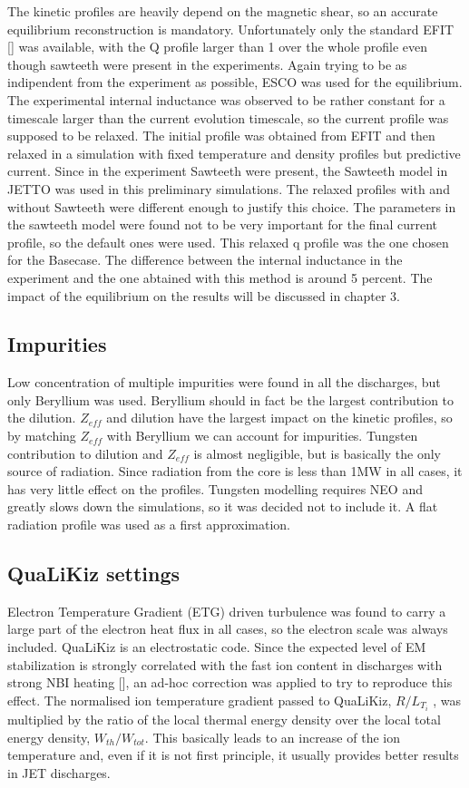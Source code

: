 \documentclass[a4paper,10pt]{iopart}
\begin{document}
The kinetic profiles are heavily depend on the magnetic shear, so an accurate equilibrium reconstruction is mandatory. Unfortunately only the standard EFIT [] was available, with the Q profile larger than 1 over the whole profile even though sawteeth were present in the experiments. Again trying to be as indipendent from the experiment as possible, ESCO was used for the equilibrium. The experimental internal inductance was observed to be rather constant for a timescale larger than the current evolution timescale, so the current profile was supposed to be relaxed. 
The initial profile was obtained from EFIT and then relaxed in a simulation with fixed temperature and density profiles but predictive current. Since in the experiment Sawteeth were present, the Sawteeth model in JETTO was used in this preliminary simulations. The relaxed profiles with and without Sawteeth were different enough to justify this choice.
The parameters in the sawteeth model were found not to be very important for the final current profile, so the default ones were used. This relaxed q profile was the one chosen for the Basecase. The difference between the internal inductance in the experiment and the one abtained with this method is around 5 percent. The impact of the equilibrium on the results will be discussed in chapter 3.

\subsection{Impurities}

Low concentration of multiple impurities were found in all the discharges, but only Beryllium was used. Beryllium should in fact be the largest contribution to the dilution. $ Z_{eff} $ and dilution have the largest impact on the kinetic profiles, so by matching  $ Z_{eff} $ with Beryllium we can account for impurities.
Tungsten contribution to dilution and  $ Z_{eff} $ is almost negligible, but is basically the only source of radiation. Since radiation from the core is less than 1MW in all cases, it has very little effect on the profiles. Tungsten modelling requires NEO and greatly slows down the simulations, so it was decided not to include it. A flat radiation profile was used as a first approximation.

\subsection{QuaLiKiz settings}

Electron Temperature Gradient (ETG) driven turbulence was found to carry a large part of the electron heat flux in all cases, so the electron scale was always included.
QuaLiKiz is an electrostatic code. Since the expected level of EM stabilization is strongly correlated with the fast ion content in discharges with strong NBI heating [], an ad-hoc correction was applied to try to reproduce this effect. The normalised ion temperature gradient passed to QuaLiKiz, $ R/L_{T_{i}} $ , was multiplied by the ratio of the local thermal energy density over the local total energy density, $ W_{th}/W_{tot}$. This basically leads to an increase of the ion temperature and, even if it is not first principle, it usually provides better results in JET discharges.
\end{document}
